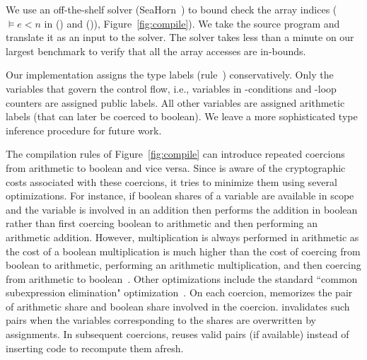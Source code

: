 We use an off-the-shelf solver
(SeaHorn~\cite{seahorn}) to bound check the array indices
($\models e < n$
in ({}) and ({})),
Figure~\ref{fig:compile}). We take the \tool source program and
translate it as an input to the solver. The solver takes less
than a minute on our largest benchmark to verify that all the array
accesses are in-bounds.

Our implementation assigns the type labels (rule~{})
conservatively. Only the variables that govern the control flow, i.e.,
variables in -conditions and -loop counters are
assigned public labels.
All other variables are assigned arithmetic labels (that can later be
coerced to boolean).
We leave a more sophisticated type inference procedure for future work.

The compilation rules of Figure~\ref{fig:compile} can introduce
repeated coercions from arithmetic to
boolean and vice versa.
Since \tool is aware of the cryptographic costs associated with these coercions,
it tries to minimize them using several optimizations.
For instance, if boolean shares of a variable are available in scope and the variable is involved in
an addition then \tool performs the addition in boolean rather than first coercing boolean to arithmetic
and then performing an arithmetic addition. However, multiplication is always performed in arithmetic
as the cost of a boolean multiplication is much higher than the cost of coercing from boolean to arithmetic, performing an arithmetic multiplication, and then coercing from arithmetic to boolean~\cite{aby}.
Other optimizations include the standard ``common subexpression elimination"
optimization~\cite{dragonbook}.
On each coercion, \tool memorizes the pair of arithmetic
share and boolean share involved in the coercion. 
\tool invalidates such pairs when the variables corresponding to the
shares are overwritten by assignments. 
In subsequent coercions, \tool  reuses valid pairs (if available)
instead of inserting code to recompute them afresh. 